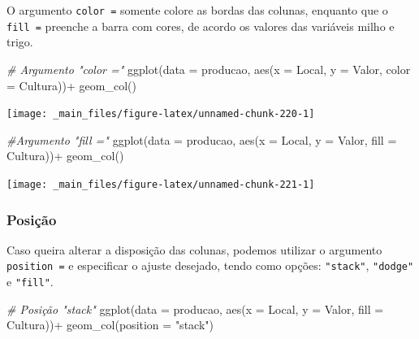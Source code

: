 \documentclass[
  brazilian,
]{book}
\newenvironment{Shaded}{\begin{snugshade}}{\end{snugshade}}
\newcommand{\AttributeTok}[1]{\textcolor[rgb]{0.77,0.63,0.00}{#1}}
\newcommand{\CommentTok}[1]{\textcolor[rgb]{0.56,0.35,0.01}{\textit{#1}}}
\newcommand{\FunctionTok}[1]{\textcolor[rgb]{0.00,0.00,0.00}{#1}}
\newcommand{\NormalTok}[1]{#1}
\newcommand{\SpecialCharTok}[1]{\textcolor[rgb]{0.00,0.00,0.00}{#1}}
\newcommand{\StringTok}[1]{\textcolor[rgb]{0.31,0.60,0.02}{#1}}
\begin{document}
O argumento \texttt{color\ =} somente colore as bordas das colunas, enquanto que o \texttt{fill\ =} preenche a barra com cores, de acordo os valores das variáveis milho e trigo.

\begin{Shaded}
\begin{Highlighting}[]
\CommentTok{\# Argumento "color ="}
\FunctionTok{ggplot}\NormalTok{(}\AttributeTok{data =}\NormalTok{ producao,}
       \FunctionTok{aes}\NormalTok{(}\AttributeTok{x =}\NormalTok{ Local,}
           \AttributeTok{y =}\NormalTok{ Valor,}
           \AttributeTok{color =}\NormalTok{ Cultura))}\SpecialCharTok{+}
  \FunctionTok{geom\_col}\NormalTok{()}
\end{Highlighting}
\end{Shaded}

\begin{center}\texttt{[image: \_main\_files/figure-latex/unnamed-chunk-220-1]} \end{center}

\begin{Shaded}
\begin{Highlighting}[]
\CommentTok{\#Argumento "fill ="}
\FunctionTok{ggplot}\NormalTok{(}\AttributeTok{data =}\NormalTok{ producao,}
       \FunctionTok{aes}\NormalTok{(}\AttributeTok{x =}\NormalTok{ Local,}
           \AttributeTok{y =}\NormalTok{ Valor,}
           \AttributeTok{fill =}\NormalTok{ Cultura))}\SpecialCharTok{+}
  \FunctionTok{geom\_col}\NormalTok{()}
\end{Highlighting}
\end{Shaded}

\begin{center}\texttt{[image: \_main\_files/figure-latex/unnamed-chunk-221-1]} \end{center}

\hypertarget{posiuxe7uxe3o}{%
\subsubsection{Posição}\label{posiuxe7uxe3o}}

Caso queira alterar a disposição das colunas, podemos utilizar o argumento \texttt{position\ =} e especificar o ajuste desejado, tendo como opções: \texttt{"stack"}, \texttt{"dodge"} e \texttt{"fill"}.

\begin{Shaded}
\begin{Highlighting}[]
\CommentTok{\# Posição "stack"}
\FunctionTok{ggplot}\NormalTok{(}\AttributeTok{data =}\NormalTok{ producao,}
       \FunctionTok{aes}\NormalTok{(}\AttributeTok{x =}\NormalTok{ Local,}
           \AttributeTok{y =}\NormalTok{ Valor,}
           \AttributeTok{fill =}\NormalTok{ Cultura))}\SpecialCharTok{+}
  \FunctionTok{geom\_col}\NormalTok{(}\AttributeTok{position =} \StringTok{"stack"}\NormalTok{)}
\end{Highlighting}
\end{Shaded}
\end{document}
